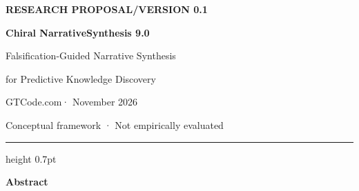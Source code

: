 \documentclass[11pt,a4paper]{article}
\renewenvironment{abstract}{%
  \par\vspace{1.1em}%
  {\sffamily\bfseries\color{CNSInk} Abstract\par}%
  \vspace{0.35em}\small\setlength{\parindent}{0pt}\noindent\ignorespaces
}{\par\vspace{0.9em}\normalsize}
\begin{document}
\thispagestyle{opening}
\begingroup
\raggedright
{\small\sffamily\bfseries\color{CNSBlue} RESEARCH PROPOSAL\enspace /\enspace VERSION 0.1\par}
\vspace{1em}
{\fontsize{27}{31}\selectfont\bfseries Chiral Narrative\newline Synthesis 9.0\par}
\vspace{0.55em}
{\Large Falsification-Guided Narrative Synthesis\par}
\vspace{0.18em}
{\large for Predictive Knowledge Discovery\par}
\vspace{0.9em}
{\normalsize\sffamily GTCode.com\enspace · November 2026\par}
\vspace{0.55em}
{\small\sffamily\color{CNSMuted} Conceptual framework · Not empirically evaluated\par}
\endgroup
\vspace{0.8em}
{\color{CNSBlue}\hrule height 0.7pt}
\begin{abstract}
\end{abstract}




\end{document}
